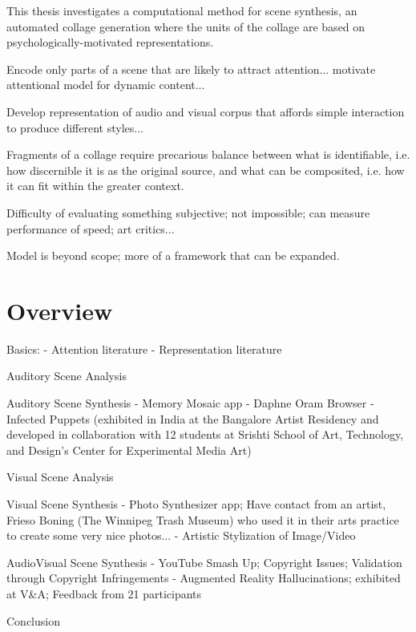 This thesis investigates a computational method for scene synthesis, an automated collage generation where the units of the collage are based on psychologically-motivated representations.  


Encode only parts of a scene that are likely to attract attention... motivate attentional model for dynamic content... 

Develop representation of audio and visual corpus that affords simple interaction to produce different styles...

Fragments of a collage require precarious balance between what is identifiable, i.e. how discernible it is as the original source, and what can be composited, i.e. how it can fit within the greater context. 

Difficulty of evaluating something subjective; not impossible; can measure performance of speed; art critics...

Model is beyond scope; more of a framework that can be expanded.

\section{Overview}

Basics:
	- Attention literature
	- Representation literature

Auditory Scene Analysis

Auditory Scene Synthesis
	- Memory Mosaic app
	- Daphne Oram Browser
	- Infected Puppets (exhibited in India at the Bangalore Artist Residency and developed in collaboration with 12 students at Srishti School of Art, Technology, and Design's Center for Experimental Media Art)
	
Visual Scene Analysis

Visual Scene Synthesis
	- Photo Synthesizer app; Have contact from an artist, Frieso Boning (The Winnipeg Trash Museum) who used it in their arts practice to create some very nice photos...
	- Artistic Stylization of Image/Video

AudioVisual Scene Synthesis
	- YouTube Smash Up; Copyright Issues; Validation through Copyright Infringements
	- Augmented Reality Hallucinations; exhibited at V\&A; Feedback from 21 participants

Conclusion









